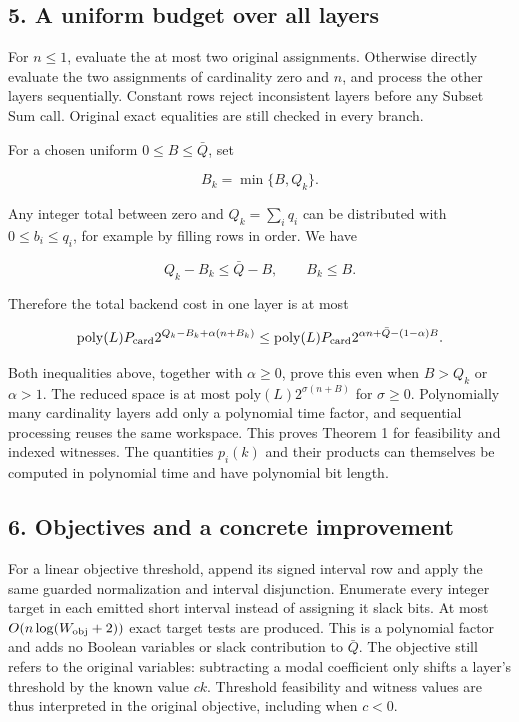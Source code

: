 \hypertarget{af-2bf1c1784c-a-uniform-budget-over-all-layers}{%
\subsection{5. A uniform budget over all layers}\label{af-2bf1c1784c-a-uniform-budget-over-all-layers}}

For \(n\le1\), evaluate the at most two original assignments. Otherwise directly evaluate the two assignments of cardinality zero and \(n\), and process the other layers sequentially. Constant rows reject inconsistent layers before any Subset Sum call. Original exact equalities are still checked in every branch.

For a chosen uniform \(0\le B\le\bar Q\), set

\[
B_k=\min\{B,Q_k\}.
\]

Any integer total between zero and \(Q_k=\sum_iq_i\) can be distributed with \(0\le b_i\le q_i\), for example by filling rows in order. We have

\[
Q_k-B_k\le\bar Q-B,\qquad B_k\le B.
\]

Therefore the total backend cost in one layer is at most

\[
\mathrm{poly}(L)P_{\rm card}
 2^{Q_k-B_k+\alpha(n+B_k)}
\le
\mathrm{poly}(L)P_{\rm card}
 2^{\alpha n+\bar Q-(1-\alpha)B}.
\]

Both inequalities above, together with \(\alpha\ge0\), prove this even when \(B>Q_k\) or \(\alpha>1\). The reduced space is at most \(\mathrm{poly}(L)2^{\sigma(n+B)}\) for \(\sigma\ge0\). Polynomially many cardinality layers add only a polynomial time factor, and sequential processing reuses the same workspace. This proves Theorem 1 for feasibility and indexed witnesses. The quantities \(p_i(k)\) and their products can themselves be computed in polynomial time and have polynomial bit length.

\hypertarget{af-2bf1c1784c-objectives-and-a-concrete-improvement}{%
\subsection{6. Objectives and a concrete improvement}\label{af-2bf1c1784c-objectives-and-a-concrete-improvement}}

For a linear objective threshold, append its signed interval row and apply the same guarded normalization and interval disjunction. Enumerate every integer target in each emitted short interval instead of assigning it slack bits. At most \(O(n\log(W_{\rm obj}+2))\) exact target tests are produced. This is a polynomial factor and adds no Boolean variables or slack contribution to \(\bar Q\). The objective still refers to the original variables: subtracting a modal coefficient only shifts a layer's threshold by the known value \(c k\). Threshold feasibility and witness values are thus interpreted in the original objective, including when \(c<0\).

